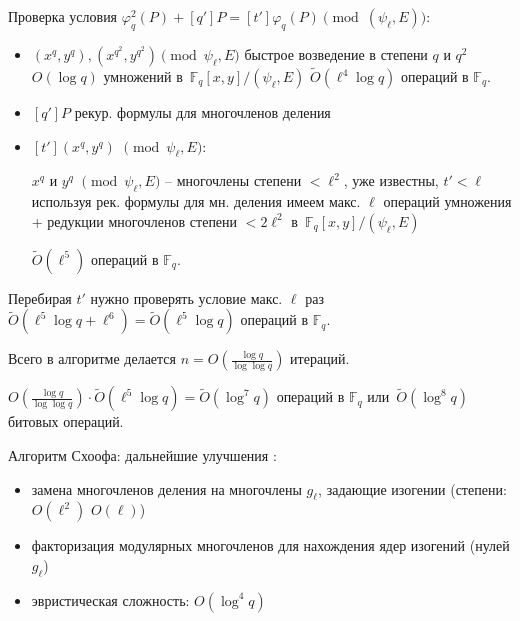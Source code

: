 \documentclass{beamer}
\begin{document}
\begin{frame}
Проверка условия $\varphi_q^2(P) + [q'] P = [t']\varphi_q(P) \pmod{(\psi_\ell, E)}$:
\begin{itemize}
    \item $(x^q, y^q), (x^{q^2}, y^{q^2}) \pmod{\psi_\ell, E} $ \MyImplies
    быстрое возведение в степени $q$ и $q^2$
    \MyImplies
    $O(\log{q})$ умножений в~$\mathbb{F}_q[x, y] / (\psi_\ell, E)$
    \MyImplies
    $\widetilde{O}(\ell^4 \log{q})$ операций в $\mathbb{F}_q$.
    
    
    \item $[q'] P$ \MyImplies рекур. формулы для многочленов деления%
    \item $[t'](x^q, y^q)$ $\pmod{\psi_\ell, E}$:
    
    $x^q$ и $y^q$ $\pmod{\psi_\ell, E}$ -- многочлены степени $< \ell^2$, уже известны, $t' < \ell$
    \MyImplies
    используя рек. формулы для мн. деления имеем макс. $\ell$ операций умножения + редукции многочленов степени $< 2 \ell^2$ в~$\mathbb{F}_q[x, y] / (\psi_\ell, E)$
    
    \MyImplies
    $\widetilde{O}(\ell^5)$ операций в $\mathbb{F}_q$.
\end{itemize}
\end{frame}

\begin{frame}
Перебирая $t'$ нужно проверять условие макс. $\ell$ раз
\MyImplies
$\widetilde{O}(\ell^5 \log{q} + \ell^6) = \widetilde{O}(\ell^5 \log{q})$ операций в $\mathbb{F}_q$.
    
Всего в алгоритме делается $n = O(\frac{\log{q}}{\log{\log{q}}})$ итераций.

$O(\frac{\log{q}}{\log{\log{q}}}) \cdot \widetilde{O}(\ell^5 \log{q}) = \widetilde{O}(\log^7{q})$ операций в $\mathbb{F}_q$ или~$\widetilde{O}(\log^8{q})$ битовых операций.

\end{frame}

\begin{frame}{Алгоритм Схоофа: дальнейшие улучшения}
    :
    \begin{itemize}
        \item замена многочленов деления на многочлены $g_\ell$, задающие изогении (степени: $O(\ell^2)$ \structure{$\implies$} $O(\ell)$)
        \item факторизация модулярных многочленов для нахождения ядер изогений (нулей $g_\ell$)
        \item эвристическая сложность: $O(\log^4{q})$
    \end{itemize}
\end{frame}
\end{document}
